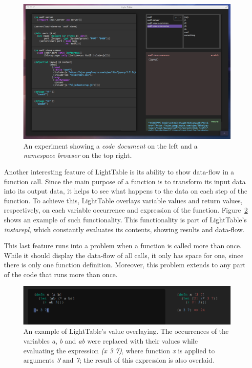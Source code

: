 \begin{figure}
  \centering
  \includegraphics[width=1.0\textwidth]{./images/lt_clojure_table}
  \caption{An experiment showing a \emph{code document} on the left and a \emph{namespace browser} on the top right.}
  \label{fig:lt:clojure:table}
\end{figure}

Another interesting feature of LightTable is its ability to show data-flow in a function call.
Since the main purpose of a function is to transform its input data into its output data, it helps to see what happens to the data on each step of the function.
To achieve this, LightTable overlays variable values and return values, respectively, on each variable occurrence and expression of the function.
Figure~\ref{fig:lt:val:overlay} shows an example of such functionality.
This functionality is part of LightTable's \emph{instarepl}, which constantly evaluates its contents, showing results and data-flow.

This last feature runs into a problem when a function is called more than once.
While it should display the data-flow of all calls, it only has space for one, since there is only one function definition.
Moreover, this problem extends to any part of the code that runs more than once.

\begin{figure}
	\centering
	\includegraphics[width=1.0\textwidth]{./images/lt_val_overlay}
	\caption[An example of LightTable's value overlaying.]{An example of LightTable's value overlaying. The occurrences of the variables \emph{a}, \emph{b} and \emph{ab} were replaced with their values while evaluating the expression \emph{(x 3 7)}, where function \emph{x} is applied to arguments \emph{3} and \emph{7}; the result of this expression is also overlaid.}
	\label{fig:lt:val:overlay}
\end{figure}

